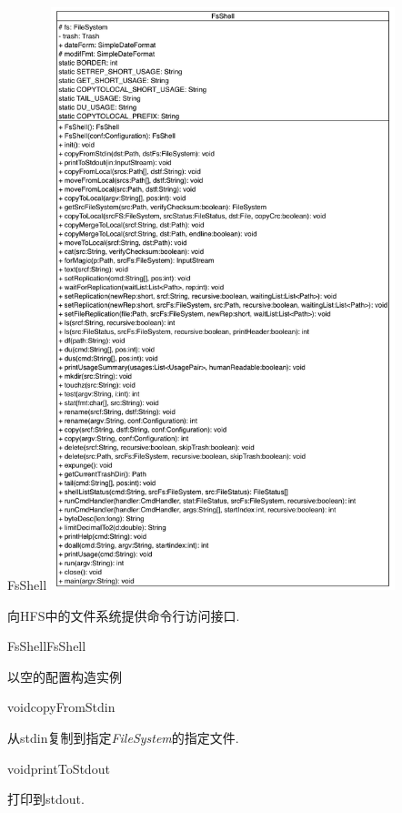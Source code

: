 \begin{XeClass}{FsShell}
\includegraphics[width=10cm]{cdig/FsShell.png}
     
 向HFS中的文件系统提供命令行访问接口. 

    \begin{XeMethod}{\XePublic}{FsShell}{FsShell}
         
 以空的配置构造实例 

    \end{XeMethod}

    \begin{XeMethod}{\XePrivate}{void}{copyFromStdin}
         
 从stdin复制到指定\emph{FileSystem}的指定文件.

    \end{XeMethod}

    \begin{XeMethod}{\XePrivate}{void}{printToStdout}
         
 打印到stdout.

    \end{XeMethod}


\end{XeClass}

